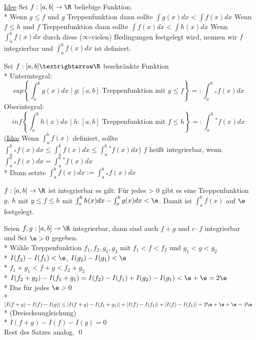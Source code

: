 \ul{Idee} Sei $f: [a, b] \to \R$ beliebige Funktion.\\*
Wenn $g \leq f$ und $g$ Treppenfunktion dann sollte $\int g(x)dx < \int f(x)dx$
Wenn $f \leq h$ und $f$ Treppenfunktion dann sollte $\int f(x)dx < \int h(x)dx$
Wenn $\int^b_a f(x)dx$ durch diese ($\infty$-vielen) Bedingungen festgelegt wird, nennen wir $f$ integrierbar und $\int_a^b f(x) dx$ ist definiert.

Sei $f:[a,b]→\R$ beschränkte Funktion\\*
Unterintegral:
$$sup \left\{\int_a^b g(x)dx\mid g:[a,b]\text{ Treppenfunktion mit }g\leq f\right\}=:\int_a^b{}_* f(x)dx$$
Oberintegral:
$$inf \left\{\int_a^b h(x)dx\mid h:[a,b]\text{ Treppenfunktion mit }f\leq h\right\}=:\int_a^b{}^* f(x)dx$$
(\ul{Idee} Wenn $\int_a^b f(x)$ definiert, sollte $ \int_a^b{}_* f(x)dx\leq \int_a^b f(x)dx \leq \int_a^b{}^* f(x)dx $)
$f$ heißt integrierbar, wenn $\int_a^b{}_* f(x)dx=\int_a^b{}^* f(x)dx$\\*
Dann setzte $\int_a^b f(x)dx:=\int_a^b{}_* f(x)dx$

$f:[a,b] \to \R$ ist integrierbar \equ{} es gilt: Für jedes \e > 0 gibt es eine Treppenfunktion $g,\ h$ mit $g \leq f \leq h$ mit $\int_a^b h(x)dx - \int_a^b g(x)dx < \e$. Damit ist $\int_a^b f(x)$ auf $\e$ festgelegt.

Seien $f, g: [a, b] \to \R$ integrierbar, dann sind auch $f + g$ und $c \cdot f$ integrierbar und
\bew
{}
Sei $\e > 0$ gegeben.\\*
Wähle Treppenfunktion $f_1, f_2, g_1, g_2$ mit $f_1 < f < f_2$ und $g_1 < g < g_2$\\*
$I(f_2) - I(f_1) < \e$, $I(g_2) - I(g_1) < \e$\\*
\Larr{} $f_1 + g_1 < f + g < f_2 + g_2$\\*
$I(f_2 + g_2) - I(f_1 + g_1) = I(f_2) - I(f_1) + I(g_2) - I(g_1) < \e + \e = 2\e$\\*
Das für jedes $\e > 0$ \\*
$|I(f + g) - I(f) - I(g)| \leq |I(f + g) - I(f_1 + g_1)| + |I(f) - I(f_1)| + |I(f) - I(f_1)| = 2\e + \e + \e = 4\e$\\*
(Dreiecksungleichung)\\*
\Rarr{} $I(f + g) - I(f) - I(g) = 0$\\
Rest des Satzes analog. \qed{}

